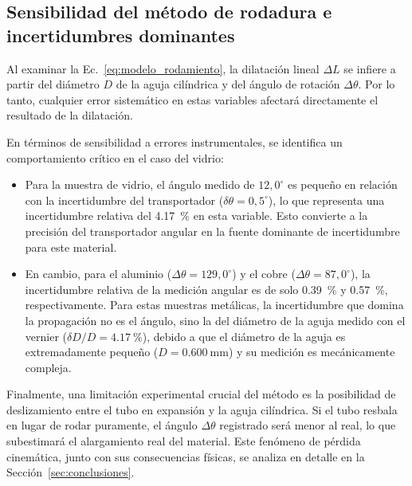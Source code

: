 \subsection{Sensibilidad del método de rodadura e incertidumbres dominantes}

Al examinar la Ec.~\eqref{eq:modelo_rodamiento}, la dilatación lineal $\Delta L$ se infiere a partir del diámetro $D$ de la aguja cilíndrica y del ángulo de rotación $\Delta\theta$. Por lo tanto, cualquier error sistemático en estas variables afectará directamente el resultado de la dilatación. 

En términos de sensibilidad a errores instrumentales, se identifica un comportamiento crítico en el caso del vidrio:
\begin{itemize}
    \item Para la muestra de vidrio, el ángulo medido de $12,0^\circ$ es pequeño en relación con la incertidumbre del transportador ($\delta\theta = 0{,}5^\circ$), lo que representa una incertidumbre relativa del \qty{4,17}{\percent} en esta variable. Esto convierte a la precisión del transportador angular en la fuente dominante de incertidumbre para este material.
    \item En cambio, para el aluminio ($\Delta\theta = 129{,}0^\circ$) y el cobre ($\Delta\theta = 87{,}0^\circ$), la incertidumbre relativa de la medición angular es de solo \qty{0,39}{\percent} y \qty{0,57}{\percent}, respectivamente. Para estas muestras metálicas, la incertidumbre que domina la propagación no es el ángulo, sino la del diámetro de la aguja medido con el vernier ($\delta D / D = \qty{4,17}{\percent}$), debido a que el diámetro de la aguja es extremadamente pequeño ($D = \qty{0,600}{\milli\meter}$) y su medición es mecánicamente compleja.
\end{itemize}

Finalmente, una limitación experimental crucial del método es la posibilidad de deslizamiento entre el tubo en expansión y la aguja cilíndrica. Si el tubo resbala en lugar de rodar puramente, el ángulo $\Delta\theta$ registrado será menor al real, lo que subestimará el alargamiento real del material. Este fenómeno de pérdida cinemática, junto con sus consecuencias físicas, se analiza en detalle en la Sección~\ref{sec:conclusiones}.